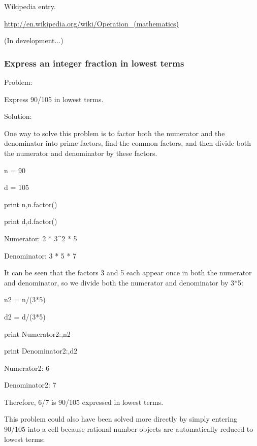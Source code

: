 \documentclass[12pt,oneside]{book}
\begin{document}
Wikipedia entry.

\href{http://en.wikipedia.org/wiki/Operation_(mathematics)}{http://en.wikipedia.org/wiki/Operation\_(mathematics)}

(In development...)

\subsubsection[Express an integer fraction in lowest terms]{Express an integer fraction in lowest terms}

{\textquotedbl}{\textquotedbl}{\textquotedbl}

Problem:

Express 90/105 in lowest terms.


Solution:

One way to solve this problem is to factor both the numerator and the denominator into prime factors, find the common factors, and then divide both the numerator and denominator by these factors.

{\textquotedbl}{\textquotedbl}{\textquotedbl}

n = 90

d = 105

print n,n.factor()

print d,d.factor()

{\textbar}

Numerator: 2 * 3\^{}2 * 5

Denominator: 3 * 5 * 7


{\textquotedbl}{\textquotedbl}{\textquotedbl}

It can be seen that the factors 3 and 5 each appear once in both the numerator and denominator, so we divide both the numerator and denominator by 3*5:

{\textquotedbl}{\textquotedbl}{\textquotedbl}

n2 = n/(3*5)

d2 = d/(3*5)

print {\textquotedbl}Numerator2:{\textquotedbl},n2

print {\textquotedbl}Denominator2:{\textquotedbl},d2

{\textbar}

Numerator2: 6

Denominator2: 7


{\textquotedbl}{\textquotedbl}{\textquotedbl}

Therefore, 6/7 is 90/105 expressed in lowest terms.


This problem could also have been solved more directly by simply entering 90/105 into a cell because rational number objects are automatically reduced to lowest terms:
\end{document}
